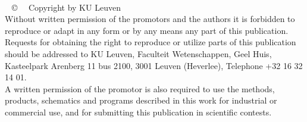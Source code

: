 \afterpage{\blankpage}
~
\newpage

\afterpage{\blankpage}
\newpage
\thispagestyle{empty}
\addtocounter{page}{-1}
~
\vfill
\copyright $\quad$ Copyright by KU Leuven\\

Without written permission of the promotors and the authors it is forbidden to reproduce or adapt in any form or by any means any part of this publication. Requests for obtaining the right to reproduce or utilize parts of this publication should be addressed to KU Leuven, Faculteit Wetenschappen, Geel Huis, Kasteelpark Arenberg 11 bus 2100, 3001 Leuven (Heverlee), Telephone +32 16 32 14 01.\\

A written permission of the promotor is also required to use the methods, products, schematics and programs described in this work for industrial or commercial use, and for submitting this publication in scientific contests.
\newpage
\addtocounter{page}{-1}
